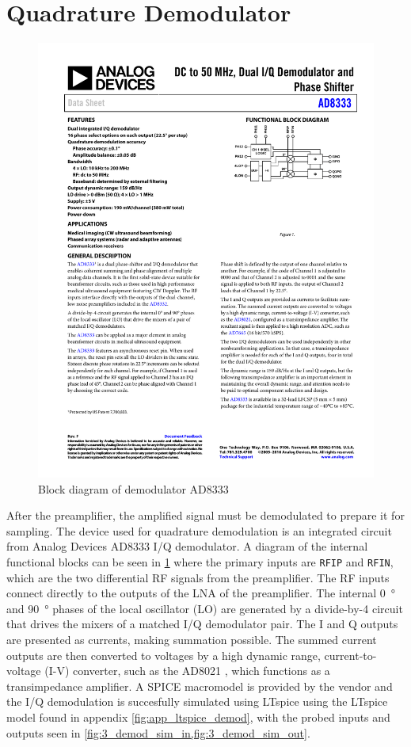 \section{Quadrature Demodulator}
\begin{figure}[htbp]
	\centering
	\includegraphics[width=.8\textwidth]{Figures/3_ad8333_block.pdf}
	\caption{Block diagram of demodulator AD8333 \cite{AD8333}}
	\label{fig:3_demodulator_block}
\end{figure}
After the preamplifier, the amplified signal must be demodulated to prepare it for sampling. The device used for quadrature demodulation is an integrated circuit from Analog Devices AD8333 \cite{AD8333} I/Q demodulator. A diagram of the internal functional blocks can be seen in \cref{fig:3_demodulator_block} where the primary inputs are \texttt{RFIP} and \texttt{RFIN}, which are the two differential RF signals from the preamplifier. The RF inputs connect directly to the outputs of the LNA of the preamplifier. The internal \qty{0}{\degree} and \qty{90}{\degree} phases of the local oscillator (LO) are generated by a divide-by-4 circuit that drives the mixers of a matched I/Q demodulator pair. The I and Q outputs are presented as currents, making summation possible. The summed current outputs are then converted to voltages by a high dynamic range, current-to-voltage (I-V) converter, such as the AD8021 \cite{AD8021}, which functions as a transimpedance amplifier. A SPICE macromodel is provided by the vendor and the I/Q demodulation is succesfully simulated using LTspice using the LTspice model found in appendix \cref{fig:app_ltspice_demod}, with the probed inputs and outputs seen in \cref{fig:3_demod_sim_in,fig:3_demod_sim_out}.

